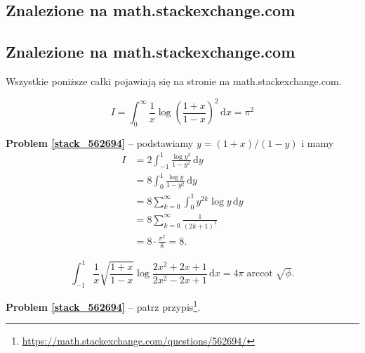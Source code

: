 %

\subsection{Znalezione na math.stackexchange.com}
\subsection{Znalezione na math.stackexchange.com} %
Wszystkie poniższe całki pojawiają się na stronie na math.stackexchange.com.

\begin{problem}[pytanie 541751]
    \label{stack_541751}%
    \begin{equation}
        I = \int_0^\infty \frac{1}{x} \log \left(\frac{1+x}{1-x}\right)^2 \,\mathrm{d}x = \pi^2
    \end{equation}
\end{problem}

\textbf{Problem \ref{stack_562694}} -- podstawiamy $y = (1+x) / (1-y)$ i mamy %
\begin{align} %
    I & = 2 \int_{-1}^1 \frac{\log y^2}{1-y^2} \,\mathrm{d}y \\ %
        & = 8 \int_0^1 \frac{\log y}{1-y^2} \, \mathrm{d}{y} \\ %
        & = 8 \sum_{k=0}^\infty \int_0^1 y^{2k} \log y \,\mathrm{d} y \\ %
        & = 8 \sum_{k=0}^\infty \frac{1}{(2k+1)^2} \\ %
        & = 8 \cdot \frac{\pi^2}{8} = 8. %
\end{align} %

\begin{problem}[pytanie 562694]
    \label{stack_562694}%
    \begin{equation}
        \int_{-1}^1 \frac{1}{x} \sqrt{\frac{1+x}{1-x}} \log \frac{2x^2+2x+1}{2x^2-2x+1} \,\mathrm{d}x = 4 \pi \operatorname{arccot} \sqrt{\phi}.
    \end{equation}
\end{problem}

\textbf{Problem \ref{stack_562694}} -- patrz przypis\footnote{\url{https://math.stackexchange.com/questions/562694/}}. %


%